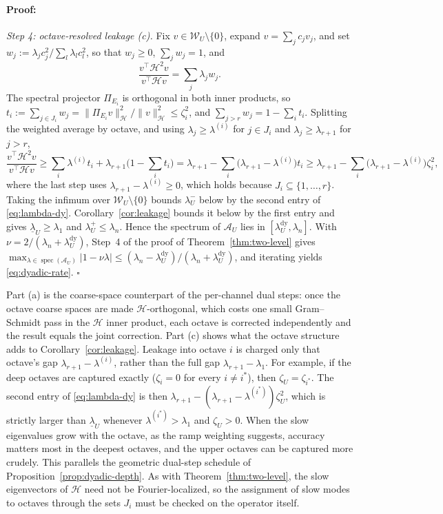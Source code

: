 \documentclass{article}
\newenvironment{proof}{\paragraph{Proof:}}{\hfill$\square$}
\begin{document}
\begin{proof}
\emph{Step 4: octave-resolved leakage (c).} Fix $v\in\mathcal W_U\setminus\{0\}$, expand $v=\sum_jc_jv_j$, and set $w_j:=\lambda_jc_j^2/\sum_l\lambda_lc_l^2$, so that $w_j\ge0$, $\sum_jw_j=1$, and
\[
\frac{v^\top\mathcal H^2v}{v^\top\mathcal Hv}=\sum_j\lambda_jw_j .
\]
The spectral projector $\Pi_{E_i}$ is orthogonal in both inner products, so $t_i:=\sum_{j\in J_i}w_j=\|\Pi_{E_i}v\|_{\mathcal H}^2/\|v\|_{\mathcal H}^2\le\zeta_i^2$, and $\sum_{j>r}w_j=1-\sum_it_i$. Splitting the weighted average by octave, and using $\lambda_j\ge\lambda^{(i)}$ for $j\in J_i$ and $\lambda_j\ge\lambda_{r+1}$ for $j>r$,
\[
\frac{v^\top\mathcal H^2v}{v^\top\mathcal Hv}
\ge\sum_i\lambda^{(i)}t_i+\lambda_{r+1}\Big(1-\sum_it_i\Big)
=\lambda_{r+1}-\sum_i\big(\lambda_{r+1}-\lambda^{(i)}\big)t_i
\ge\lambda_{r+1}-\sum_i\big(\lambda_{r+1}-\lambda^{(i)}\big)\zeta_i^2 ,
\]
where the last step uses $\lambda_{r+1}-\lambda^{(i)}\ge0$, which holds because $J_i\subseteq\{1,\dots,r\}$. Taking the infimum over $\mathcal W_U\setminus\{0\}$ bounds $\lambda_U^-$ below by the second entry of \eqref{eq:lambda-dy}. Corollary~\ref{cor:leakage} bounds it below by the first entry and gives $\underline\lambda_U\ge\lambda_1$ and $\lambda_U^+\le\lambda_n$. Hence the spectrum of $\mathcal A_U$ lies in $[\lambda_U^{\mathrm{dy}},\lambda_n]$. With $\nu=2/(\lambda_n+\lambda_U^{\mathrm{dy}})$, Step~4 of the proof of Theorem~\ref{thm:two-level} gives $\max_{\lambda\in\operatorname{spec}(\mathcal A_U)}|1-\nu\lambda|\le(\lambda_n-\lambda_U^{\mathrm{dy}})/(\lambda_n+\lambda_U^{\mathrm{dy}})$, and iterating yields \eqref{eq:dyadic-rate}.
\end{proof}

Part (a) is the coarse-space counterpart of the per-channel dual steps: once the octave coarse spaces are made $\mathcal H$-orthogonal, which costs one small Gram--Schmidt pass in the $\mathcal H$ inner product, each octave is corrected independently and the result equals the joint correction. Part (c) shows what the octave structure adds to Corollary~\ref{cor:leakage}. Leakage into octave $i$ is charged only that octave's gap $\lambda_{r+1}-\lambda^{(i)}$, rather than the full gap $\lambda_{r+1}-\lambda_1$. For example, if the deep octaves are captured exactly ($\zeta_i=0$ for every $i\neq i^\ast$), then $\zeta_U=\zeta_{i^\ast}$. The second entry of \eqref{eq:lambda-dy} is then $\lambda_{r+1}-(\lambda_{r+1}-\lambda^{(i^\ast)})\zeta_U^2$, which is strictly larger than $\underline\lambda_U$ whenever $\lambda^{(i^\ast)}>\lambda_1$ and $\zeta_U>0$. When the slow eigenvalues grow with the octave, as the ramp weighting suggests, accuracy matters most in the deepest octaves, and the upper octaves can be captured more crudely. This parallels the geometric dual-step schedule of Proposition~\ref{prop:dyadic-depth}. As with Theorem~\ref{thm:two-level}, the slow eigenvectors of $\mathcal H$ need not be Fourier-localized, so the assignment of slow modes to octaves through the sets $J_i$ must be checked on the operator itself.
\end{document}

